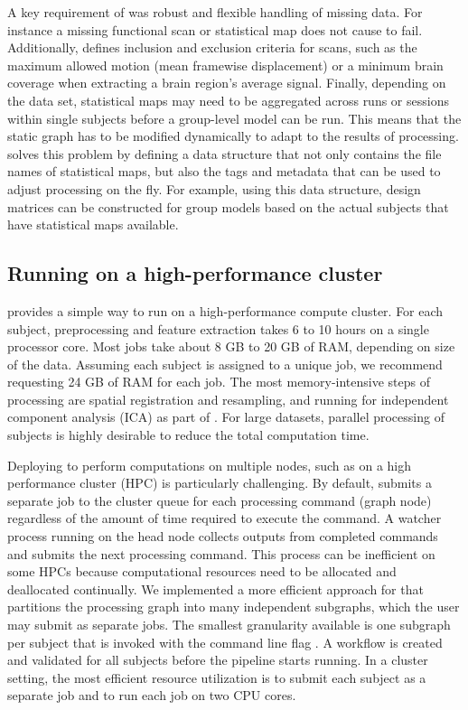 A key requirement of  was robust and flexible handling of
missing data. For instance a missing functional scan or statistical map
does not cause  to fail. Additionally, 
defines inclusion and exclusion criteria for scans, such as the maximum
allowed motion (mean framewise displacement) or a minimum brain coverage
when extracting a brain region's average signal. Finally, depending on the
data set, statistical maps may need to be aggregated across runs or
sessions within single subjects before a group-level model can be run. This
means that the static graph has to be modified dynamically to adapt to the
results of processing.  solves this problem by defining a
data structure that not only contains the file names of statistical maps,
but also the tags and metadata that can be used to adjust processing on the
fly. For example, using this data structure, design matrices can be
constructed for group models based on the actual subjects that have
statistical maps available.

\subsection{Running on a high-performance cluster}

 provides a simple way to run on a high-performance compute
cluster. For each subject, preprocessing and feature extraction takes 6 to
10 hours on a single processor core. Most jobs take about 8 GB to 20 GB of
RAM, depending on size of the data. Assuming each subject is assigned to a
unique job, we recommend requesting 24 GB of RAM for each job. The most
memory-intensive steps of processing are spatial registration and
resampling, and running  for independent component
analysis (ICA) as part of 
\citep{10.1016/j.neuroimage.2015.02.064}. For large datasets, parallel
processing of subjects is highly desirable to reduce the total computation
time.

Deploying  to perform computations on multiple nodes, such as
on a high performance cluster (HPC) is particularly challenging. By
default,  submits a separate job to the cluster queue for each
processing command (graph node) regardless of the amount of time required
to execute the command. A watcher process running on the head node collects
outputs from completed commands and submits the next processing command.
This process can be inefficient on some HPCs because computational
resources need to be allocated and deallocated continually. We implemented
a more efficient approach for  that partitions the
processing graph into many independent subgraphs, which the user may submit
as separate jobs. The smallest granularity available is one subgraph per
subject that is invoked with the command line flag .
A  workflow is created and validated for all subjects before
the pipeline starts running. In a cluster setting, the most efficient
resource utilization is to submit each subject as a separate job and to run
each job on two CPU cores.

